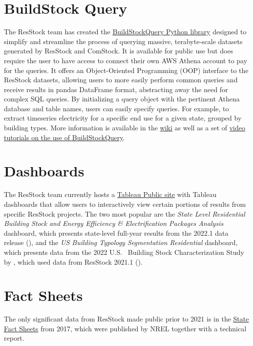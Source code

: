 \section{BuildStock Query}
The ResStock team has created the \href{https://github.com/NREL/buildstock-query/}{BuildStockQuery Python library} designed to simplify and streamline the process of querying massive, terabyte-scale datasets generated by ResStock and ComStock. It is available for public use but does require the user to have access to connect their own AWS Athena account to pay for the queries. It offers an Object-Oriented Programming (OOP) interface to the ResStock  datasets, allowing users to more easily perform common queries and receive results in pandas DataFrame format, abstracting away the need for complex SQL queries. By initializing a query object with the pertinent Athena database and table names, users can easily specify queries. For example, to extract timeseries electricity for a specific end use for a given state, grouped by building types. More information is available in the \href{ https://github.com/NREL/buildstock-query/wiki}{wiki} as well as a set of \href{https://www.youtube.com/watch?v=jmmAHsOZAp8&list=PLmIn8Hncs7bEYCZiHaoPSovoBrRGR-tRS&index=8}{video tutorials on the use of BuildStockQuery}.

\section{Dashboards}
The ResStock team currently hosts a \href{https://public.tableau.com/app/profile/nrel.buildingstock/vizzes}{Tableau Public site} with Tableau dashboards that allow users to interactively view certain portions of results from specific ResStock projects. The two most popular are the \textit{State Level Residential Building Stock and Energy Efficiency \& Electrification Packages Analysis} dashboard, which presents state-level full-year results from the 2022.1 data release (\cite{Present2022}), and the \textit{US Building Typology Segmentation Residential} dashboard, which presents data from the 2022 U.S.~ Building Stock Characterization Study by \citet{Reyna2022}, which used data from ResStock 2021.1 (\cite{Wilson2022}). 

\section{Fact Sheets}
The only significant data from ResStock made public prior to 2021 is in the \href{https://resstock.nrel.gov/factsheets/}{State Fact Sheets} from 2017, which were published by NREL together with a technical report. 

